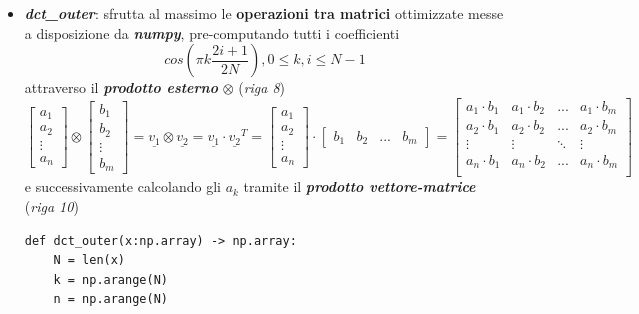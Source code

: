 \begin{itemize}
        \item \textit{\textbf{dct\_outer}}: sfrutta al massimo le \textbf{operazioni tra matrici} ottimizzate messe a disposizione da \textbf{\textit{numpy}}, pre-computando tutti i coefficienti 
        $$cos(\pi k \frac{2 i + 1}{2 N}), 0 \leq k, i \leq N-1$$
        attraverso il \textbf{\textit{prodotto esterno}} $\otimes$ (\textit{riga 8})
        \begin{equation}
            \begin{bmatrix}
            a_1 \\
            a_2 \\
            \vdots \\
            a_n
            \end{bmatrix}
            \otimes
            \begin{bmatrix}
            b_1 \\
            b_2 \\
            \vdots \\
            b_m
            \end{bmatrix}
            =
            \underline{v_1} \otimes \underline{v_2} = \underline{v_1} \cdot \underline{v_2}^{T}
            =
            \begin{bmatrix}
            a_1 \\
            a_2 \\
            \vdots \\
            a_n
            \end{bmatrix}
            \cdot
            \begin{bmatrix} b_1 & b_2 & ... & b_m \end{bmatrix}
            =
            \begin{bmatrix}
            a_1 \cdot b_1 & a_1 \cdot b_2 & ... & a_1 \cdot b_m \\
            a_2 \cdot b_1 & a_2 \cdot b_2 & ... & a_2 \cdot b_m \\
            \vdots & \vdots & \ddots & \vdots \\
            a_n \cdot b_1 & a_n \cdot b_2 & ... & a_n \cdot b_m \\
            \end{bmatrix}
            \end{equation}
        e successivamente calcolando gli $a_k$ tramite il \textbf{\textit{prodotto vettore-matrice}} (\textit{riga 10})

        \begin{lstlisting}
def dct_outer(x:np.array) -> np.array:
    N = len(x)
    k = np.arange(N)                                        
    n = np.arange(N)                                         


\end{lstlisting}
\end{itemize}
